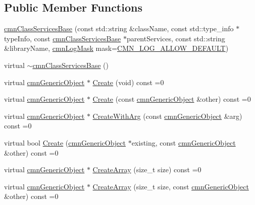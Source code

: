\subsection*{Public Member Functions}
\begin{DoxyCompactItemize}
\item 
\hyperlink{classcmn_class_services_base_a63070c19576f22c52346f4bf90a0e4ea}{cmn\+Class\+Services\+Base} (const std\+::string \&class\+Name, const std\+::type\+\_\+info $\ast$type\+Info, const \hyperlink{classcmn_class_services_base}{cmn\+Class\+Services\+Base} $\ast$parent\+Services, const std\+::string \&library\+Name, \hyperlink{cmn_log_lo_d_8h_a44b6ef7560b0d204460b0a54f1a5d702}{cmn\+Log\+Mask} mask=\hyperlink{cmn_log_lo_d_8h_a941e5ff3075571f0ad1e53e1204bd856}{C\+M\+N\+\_\+\+L\+O\+G\+\_\+\+A\+L\+L\+O\+W\+\_\+\+D\+E\+F\+A\+U\+L\+T})
\item 
virtual \hyperlink{classcmn_class_services_base_aa4843bb764060136cfc9622d6def7562}{$\sim$cmn\+Class\+Services\+Base} ()
\item 
virtual \hyperlink{classcmn_generic_object}{cmn\+Generic\+Object} $\ast$ \hyperlink{classcmn_class_services_base_a0028698e7a2d3a666bfc34e408888da4}{Create} (void) const =0
\item 
virtual \hyperlink{classcmn_generic_object}{cmn\+Generic\+Object} $\ast$ \hyperlink{classcmn_class_services_base_a737f4ac5b23f6d1fbca401057808a735}{Create} (const \hyperlink{classcmn_generic_object}{cmn\+Generic\+Object} \&other) const =0
\item 
virtual \hyperlink{classcmn_generic_object}{cmn\+Generic\+Object} $\ast$ \hyperlink{classcmn_class_services_base_a8dea3c1fa8d047e557504a7992986dc3}{Create\+With\+Arg} (const \hyperlink{classcmn_generic_object}{cmn\+Generic\+Object} \&arg) const =0
\item 
virtual bool \hyperlink{classcmn_class_services_base_a67950a4c90805ce5404c3e66a3ffeb13}{Create} (\hyperlink{classcmn_generic_object}{cmn\+Generic\+Object} $\ast$existing, const \hyperlink{classcmn_generic_object}{cmn\+Generic\+Object} \&other) const =0
\item 
virtual \hyperlink{classcmn_generic_object}{cmn\+Generic\+Object} $\ast$ \hyperlink{classcmn_class_services_base_a13e2ee9caebfc333b50f0bd3b75f601b}{Create\+Array} (size\+\_\+t size) const =0
\item 
virtual \hyperlink{classcmn_generic_object}{cmn\+Generic\+Object} $\ast$ \hyperlink{classcmn_class_services_base_a585a038a9a33973cd2f6a8a0ec251a7d}{Create\+Array} (size\+\_\+t size, const \hyperlink{classcmn_generic_object}{cmn\+Generic\+Object} \&other) const =0

\end{DoxyCompactItemize}

